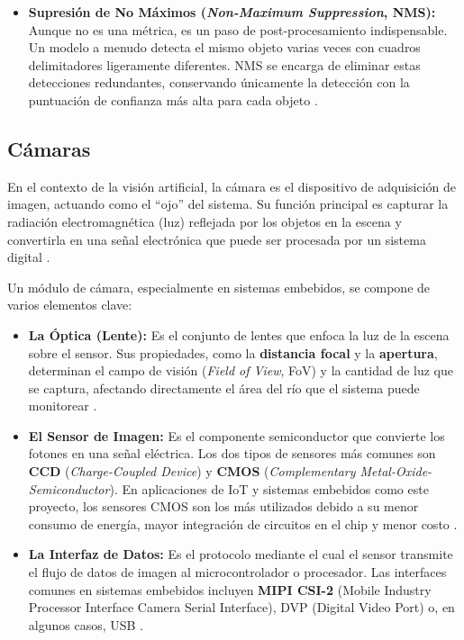 \begin{itemize}
    \item \textbf{Supresión de No Máximos (\textit{Non-Maximum Suppression}, NMS):} Aunque no es una métrica, es un paso de post-procesamiento indispensable. Un modelo a menudo detecta el mismo objeto varias veces con cuadros delimitadores ligeramente diferentes. NMS se encarga de eliminar estas detecciones redundantes, conservando únicamente la detección con la puntuación de confianza más alta para cada objeto \cite{sapkota2025yolo}.
\end{itemize}


\subsection{Cámaras}
\label{subsec:camaras}

En el contexto de la visión artificial, la cámara es el dispositivo de adquisición de imagen, actuando como el ``ojo'' del sistema. Su función principal es capturar la radiación electromagnética (luz) reflejada por los objetos en la escena y convertirla en una señal electrónica que puede ser procesada por un sistema digital \cite{szeliski2022computer}.

Un módulo de cámara, especialmente en sistemas embebidos, se compone de varios elementos clave:

\begin{itemize}
    \item \textbf{La Óptica (Lente):} Es el conjunto de lentes que enfoca la luz de la escena sobre el sensor. Sus propiedades, como la \textbf{distancia focal} y la \textbf{apertura}, determinan el campo de visión (\textit{Field of View}, FoV) y la cantidad de luz que se captura, afectando directamente el área del río que el sistema puede monitorear \cite{szeliski2022computer}.

    \item \textbf{El Sensor de Imagen:} Es el componente semiconductor que convierte los fotones en una señal eléctrica. Los dos tipos de sensores más comunes son \textbf{CCD} (\textit{Charge-Coupled Device}) y \textbf{CMOS} (\textit{Complementary Metal-Oxide-Semiconductor}). En aplicaciones de IoT y sistemas embebidos como este proyecto, los sensores CMOS son los más utilizados debido a su menor consumo de energía, mayor integración de circuitos en el chip y menor costo \cite{fossum1997cmos}.

    \item \textbf{La Interfaz de Datos:} Es el protocolo mediante el cual el sensor transmite el flujo de datos de imagen al microcontrolador o procesador. Las interfaces comunes en sistemas embebidos incluyen \textbf{MIPI CSI-2} (Mobile Industry Processor Interface Camera Serial Interface), DVP (Digital Video Port) o, en algunos casos, USB \cite{mipi2019csi}.
\end{itemize}

